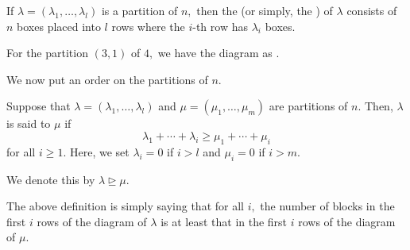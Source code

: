 \begin{defn}%
	\label{defn:youngdiag}
	If $\lambda = (\lambda_1, \ldots, \lambda_l)$ is a partition of $n,$ then the  (or simply, the ) of $\lambda$ consists of $n$ boxes placed into $l$ rows where the $i$-th row has $\lambda_i$ boxes.
\end{defn}

\begin{ex}
	For the partition $(3, 1)$ of $4,$ we have the diagram as .
\end{ex}



We now put an order on the partitions of $n.$
\begin{defn}%
	\label{defn:domorder}
	Suppose that $\lambda = (\lambda_1, \ldots, \lambda_l)$ and $\mu = (\mu_1, \ldots, \mu_m)$ are partitions of $n.$ Then, $\lambda$ is said to  $\mu$ if
	\begin{equation*} 
		\lambda_1 + \cdots + \lambda_i \ge \mu_1 + \cdots + \mu_i
	\end{equation*}
	for all $i \ge 1.$ Here, we set $\lambda_i = 0$ if $i > l$ and $\mu_i = 0$ if $i > m.$

	We denote this by $\lambda \unrhd \mu.$
\end{defn}

\begin{rem}
	The above definition is simply saying that for all $i,$ the number of blocks in the first $i$ rows of the diagram of $\lambda$ is at least that in the first $i$ rows of the diagram of $\mu.$
\end{rem}

